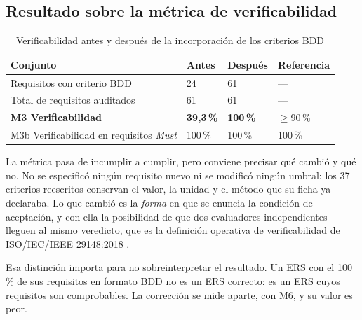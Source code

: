 \subsection*{Resultado sobre la métrica de verificabilidad}

\begin{table}[H]
\centering\footnotesize
\caption{Verificabilidad antes y después de la incorporación de los criterios BDD}
\label{tab:m3-antes-despues}
\begin{tabular}{|L{5.6cm}|C{3.2cm}|C{3.2cm}|C{2.6cm}|}
\hline
{}\textbf{Conjunto} & \textbf{Antes} & \textbf{Después} & \textbf{Referencia}\\ \hline
Requisitos con criterio BDD & 24 & 61 & ---\\ \hline
Total de requisitos auditados & 61 & 61 & ---\\ \hline
\textbf{M3 Verificabilidad} & \textbf{39,3\,\%} & \textbf{100\,\%} & $\geq 90$\,\%\\ \hline
M3b Verificabilidad en requisitos \emph{Must} & 100\,\% & 100\,\% & 100\,\%\\ \hline
\end{tabular}
\end{table}

\noindent
La métrica pasa de incumplir a cumplir, pero conviene precisar qué cambió y qué no. No se
especificó ningún requisito nuevo ni se modificó ningún umbral: los 37 criterios reescritos
conservan el valor, la unidad y el método que su ficha ya declaraba. Lo que cambió es la
\emph{forma} en que se enuncia la condición de aceptación, y con ella la posibilidad de que dos
evaluadores independientes lleguen al mismo veredicto, que es la definición operativa de
verificabilidad de ISO/IEC/IEEE 29148:2018 \cite{iso29148}.

Esa distinción importa para no sobreinterpretar el resultado. Un ERS con el 100\,\% de sus
requisitos en formato BDD no es un ERS correcto: es un ERS cuyos requisitos son comprobables. La
corrección se mide aparte, con M6, y su valor es peor.
